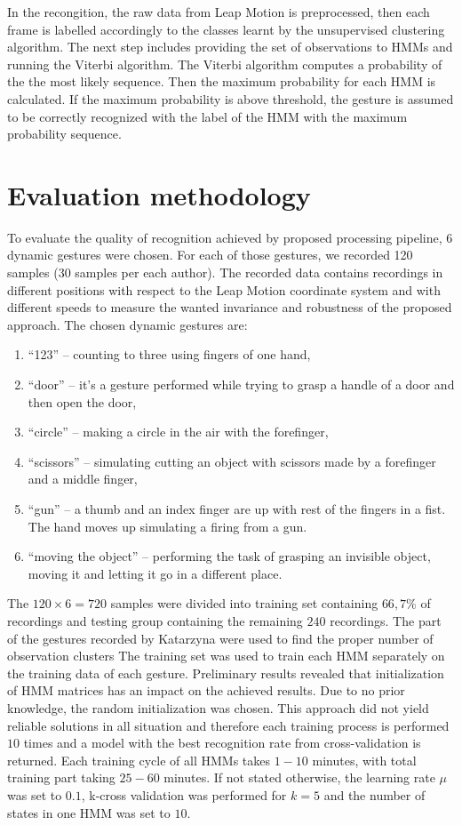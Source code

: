 In the recongition, the raw data from Leap Motion is preprocessed, then each frame is labelled accordingly to the classes learnt by the unsupervised clustering algorithm.
The next step includes providing the set of observations to HMMs and running the Viterbi algorithm.
The Viterbi algorithm computes a probability of the the most likely sequence.
Then the maximum probability for each HMM is calculated.
If the maximum probability is above threshold, the gesture is assumed to be correctly recognized with the label of the HMM with the maximum probability sequence.


\section{Evaluation methodology}

To evaluate the quality of recognition achieved by proposed processing pipeline, $6$ dynamic gestures were chosen.
For each of those gestures, we recorded 120 samples (30 samples per each author).
The recorded data contains recordings in different positions with respect to the Leap Motion coordinate system and with different speeds to measure the wanted invariance and robustness of the proposed approach.
The chosen dynamic gestures are:
\begin{enumerate}
\item ``123'' -- counting to three using fingers of one hand,
\item ``door'' -- it's a gesture performed while trying to grasp a handle of a door and then open the door,
\item ``circle'' -- making a circle in the air with the forefinger,
\item ``scissors'' -- simulating cutting an object with scissors made by a forefinger and a middle finger,
\item ``gun'' -- a thumb and an index finger are up with rest of the fingers in a fist. The hand moves up simulating a firing from a gun.
\item ``moving the object'' -- performing the task of grasping an invisible object, moving it and letting it go in a different place.
\end{enumerate}

The $120\times6=720$ samples were divided into training set containing $66,7\%$ of recordings and testing group containing the remaining $240$ recordings. 
The part of the gestures recorded by Katarzyna were used to find the proper number of observation clusters
The training set was used to train each HMM separately on the training data of each gesture.
Preliminary results revealed that initialization of HMM matrices has an impact on the achieved results.
Due to no prior knowledge, the random initialization was chosen.
This approach did not yield reliable solutions in all situation and therefore each training process is performed $10$ times and a model with the best recognition rate from cross-validation is returned.  
Each training cycle of all HMMs takes $1-10$ minutes, with total training part taking $25-60$ minutes.
If not stated otherwise, the learning rate $\mu$ was set to $0.1$, k-cross validation was performed for $k=5$ and the number of states in one HMM was set to $10$.


